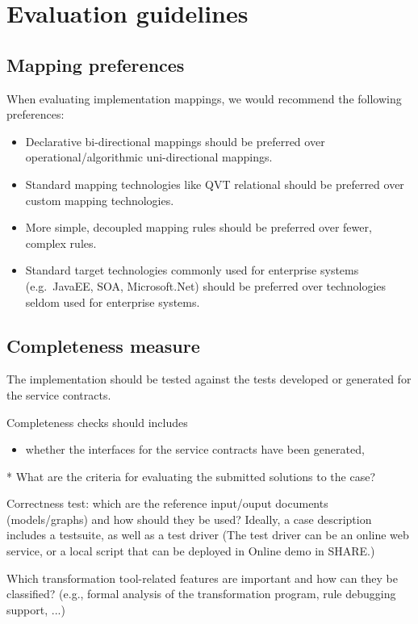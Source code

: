 \section{Evaluation guidelines}



\subsection{Mapping preferences}

When evaluating implementation mappings, we would recommend the following preferences:
\begin{itemize}
  \item Declarative bi-directional mappings should be preferred over operational/algorithmic uni-directional mappings. 
  \item Standard mapping technologies like QVT relational should be preferred over custom mapping technologies.
  \item More simple, decoupled mapping rules should be preferred over fewer, complex rules.
  \item Standard target technologies commonly used for enterprise systems (e.g.\ JavaEE, SOA, Microsoft.Net) should be preferred over technologies seldom used for enterprise systems.
\end{itemize}

\subsection{Completeness measure}
The implementation should be tested against the tests developed or generated for the service contracts. 

Completeness checks should includes
\begin{itemize}
  \item whether the interfaces for the service contracts have been generated,
 
\end{itemize}


   * What are the criteria for evaluating the submitted solutions to the case?
    
      Correctness test: which are the reference input/ouput documents (models/graphs) and how should they be used? Ideally, a case description includes a testsuite, as well as a test driver
            (The test driver can be an online web service, or a local script that can be deployed in Online demo in SHARE.)

          Which transformation tool-related features are important and how can they be classified?
            (e.g., formal analysis of the transformation program, rule debugging support, ...)

